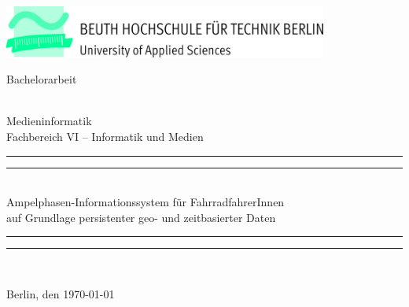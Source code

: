 \begin{titlepage}


\center %
 

\begin{center}
\includegraphics[width=0.8\textwidth]{img/beuth}  \\[2cm]
\end{center}

\begin{Huge}
Bachelorarbeit
\end{Huge}\\[0.5cm]
\LARGE{Medieninformatik}\\
\large{Fachbereich VI -- Informatik und Medien}\\[0.5cm]

\rule{\textwidth}{1.6pt}\vspace*{-\baselineskip}\vspace*{2pt} %
\rule{\textwidth}{0.4pt}\\[\baselineskip] %
{\LARGE Ampelphasen-Informationssystem für FahrradfahrerInnen\\ auf Grundlage persistenter geo- und zeitbasierter Daten}\\[\baselineskip]

\rule{\textwidth}{0.4pt}\vspace*{-\baselineskip}\vspace{3.2pt} %
\rule{\textwidth}{1.6pt}\\[\baselineskip]\vspace{3.2pt} %

{\Large Berlin, den \today{}} \\[7cm]


\end{titlepage}
